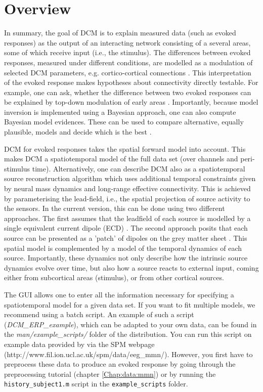 \section{Overview}
In summary, the goal of DCM is to explain measured data (such as evoked
responses) as the output of an interacting network consisting of a several
areas, some of which receive input (i.e., the stimulus). The differences between
evoked responses, measured under different conditions, are modelled as
a modulation of selected DCM parameters, e.g. cortico-cortical
connections \cite{od_dcm_erp}. This interpretation of the evoked
response makes hypotheses about connectivity directly testable. For
example, one can ask, whether the difference between two
evoked responses can be explained by top-down modulation of early areas
\cite{mg_dcm_repro}. Importantly, because model inversion is implemented
using a Bayesian approach, one can also compute Bayesian model evidences. These
can be used to compare alternative, equally plausible, models and
decide which is the best \cite{stefan_neurodynamics}.

DCM for evoked responses takes the spatial forward model into
account. This makes DCM a spatiotemporal model of the full data set
(over channels and peri-stimulus time). Alternatively, one can
describe DCM also as a spatiotemporal source reconstruction algorithm which uses
additional temporal constraints given by neural mass dynamics and
long-range effective connectivity. This is achieved by parameterising
the lead-field, i.e., the spatial projection of source
activity to the sensors. In the current version, this can be done
using two different approaches. The first assumes that the leadfield
of each source is modelled by a single equivalent current dipole
(ECD) \cite{sjk_dcm_erp}. The second approach posits that each source
can be presented as a 'patch' of dipoles on the grey matter sheet
\cite{jean_distributed}. This spatial model is complemented
by a model of the temporal dynamics of each source. Importantly, these
dynamics not only describe how the intrinsic source dynamics evolve
over time, but also how a source reacts to external input, coming
either from subcortical areas (stimulus), or from other cortical
sources.

The GUI allows one to enter all the information necessary for specifying a
spatiotemporal model for a given data set. If you want to fit multiple
models, we recommend using a batch script. An example of such
a script (\textit{DCM\_ERP\_example}), which can be adapted to your
own data, can be found in the \textit{man/example\_scripts/} folder of
the distribution. You can run this script on example data provided by via the SPM webpage (http://www.fil.ion.ucl.ac.uk/spm/data/eeg\_mmn/). However, you first have to preprocess these data to produce an evoked response by going through the preprocessing tutorial (chapter \ref{Chap:data:mmn}) or by running the \texttt{history\_subject1.m} script in the \texttt{example\_scripts} folder.


